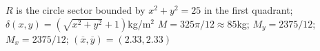{$R$ is the circle sector bounded by $x^2+y^2=25$ in the first quadrant; $\delta(x,y) = (\sqrt{x^2+y^2}+1)$kg/m$^2$
}
{$M = 325\pi/12\approx 85$kg; $M_y= 2375/12$; $M_x = 2375/12$; $(\overline{x},\overline{y}) = (2.33,2.33)$
}